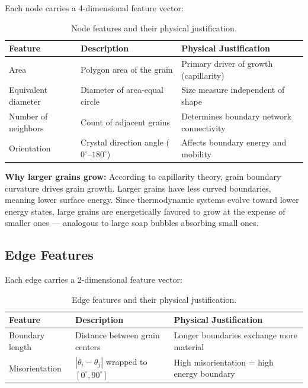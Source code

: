 \documentclass[12pt, a4paper]{article}
\begin{document}
Each node carries a 4-dimensional feature vector:

\begin{table}[H]
\centering
\begin{tabular}{lll}
\toprule
\textbf{Feature} & \textbf{Description} & \textbf{Physical Justification} \\
\midrule
Area & Polygon area of the grain & Primary driver of growth (capillarity) \\
Equivalent diameter & Diameter of area-equal circle & Size measure independent of shape \\
Number of neighbors & Count of adjacent grains & Determines boundary network connectivity \\
Orientation & Crystal direction angle ($0^\circ$--$180^\circ$) & Affects boundary energy and mobility \\
\bottomrule
\end{tabular}
\caption{Node features and their physical justification.}
\end{table}

\textbf{Why larger grains grow:} According to capillarity theory, grain
boundary curvature drives grain growth. Larger grains have less curved
boundaries, meaning lower surface energy. Since thermodynamic systems evolve
toward lower energy states, large grains are energetically favored to grow
at the expense of smaller ones — analogous to large soap bubbles absorbing
small ones.

\subsection{Edge Features}

Each edge carries a 2-dimensional feature vector:

\begin{table}[H]
\centering
\begin{tabular}{lll}
\toprule
\textbf{Feature} & \textbf{Description} & \textbf{Physical Justification} \\
\midrule
Boundary length & Distance between grain centers & Longer boundaries exchange more material \\
Misorientation & $|\theta_i - \theta_j|$ wrapped to $[0^\circ, 90^\circ]$ & High misorientation = high energy boundary \\
\bottomrule
\end{tabular}
\caption{Edge features and their physical justification.}
\end{table}
\end{document}
